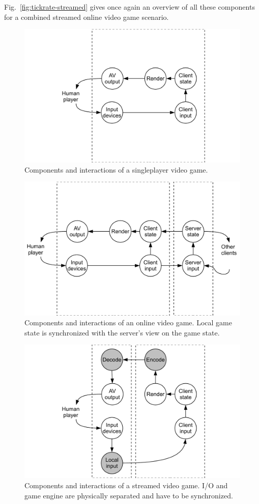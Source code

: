 Fig.~\ref{fig:tickrate-streamed} gives once again an overview of all these components for a combined streamed online video game scenario.

\begin{figure}
  \centering
  \includegraphics[width=0.8\columnwidth]{../models/component_interaction-local.pdf}
  \caption{Components and interactions of a singleplayer video game.}
  \label{fig:component-model-local}
\end{figure}

\begin{figure}
  \centering
  \includegraphics[width=0.8\columnwidth]{../models/component_interaction-online.pdf}
  \caption{Components and interactions of an online video game. Local game state is synchronized with the server's view on the game state.}
  \label{fig:component-model-online}
\end{figure}


\begin{figure}
  \centering
  \includegraphics[width=0.8\columnwidth]{../models/component_interaction-cloud.pdf}
  \caption{Components and interactions of a streamed video game. I/O and game engine are physically separated and have to be synchronized.}
  \label{fig:component-model-cloud}
\end{figure}


